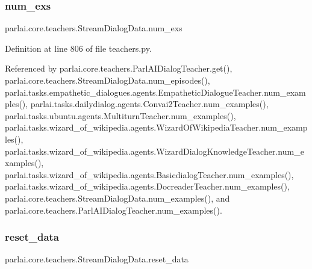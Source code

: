 \mbox{\label{classparlai_1_1core_1_1teachers_1_1StreamDialogData_a6aa5dc9644a792b801bc7cf69a194ae6}} 
\subsubsection{\texorpdfstring{num\+\_\+exs}{num\_exs}}
{\footnotesize\ttfamily parlai.\+core.\+teachers.\+Stream\+Dialog\+Data.\+num\+\_\+exs}



Definition at line 806 of file teachers.\+py.



Referenced by parlai.\+core.\+teachers.\+Parl\+A\+I\+Dialog\+Teacher.\+get(), parlai.\+core.\+teachers.\+Stream\+Dialog\+Data.\+num\+\_\+episodes(), parlai.\+tasks.\+empathetic\+\_\+dialogues.\+agents.\+Empathetic\+Dialogue\+Teacher.\+num\+\_\+examples(), parlai.\+tasks.\+dailydialog.\+agents.\+Convai2\+Teacher.\+num\+\_\+examples(), parlai.\+tasks.\+ubuntu.\+agents.\+Multiturn\+Teacher.\+num\+\_\+examples(), parlai.\+tasks.\+wizard\+\_\+of\+\_\+wikipedia.\+agents.\+Wizard\+Of\+Wikipedia\+Teacher.\+num\+\_\+examples(), parlai.\+tasks.\+wizard\+\_\+of\+\_\+wikipedia.\+agents.\+Wizard\+Dialog\+Knowledge\+Teacher.\+num\+\_\+examples(), parlai.\+tasks.\+wizard\+\_\+of\+\_\+wikipedia.\+agents.\+Basicdialog\+Teacher.\+num\+\_\+examples(), parlai.\+tasks.\+wizard\+\_\+of\+\_\+wikipedia.\+agents.\+Docreader\+Teacher.\+num\+\_\+examples(), parlai.\+core.\+teachers.\+Stream\+Dialog\+Data.\+num\+\_\+examples(), and parlai.\+core.\+teachers.\+Parl\+A\+I\+Dialog\+Teacher.\+num\+\_\+examples().

\mbox{\label{classparlai_1_1core_1_1teachers_1_1StreamDialogData_ae054596c459b22bbeacf622a5208b785}} 
\subsubsection{\texorpdfstring{reset\+\_\+data}{reset\_data}}
{\footnotesize\ttfamily parlai.\+core.\+teachers.\+Stream\+Dialog\+Data.\+reset\+\_\+data}



